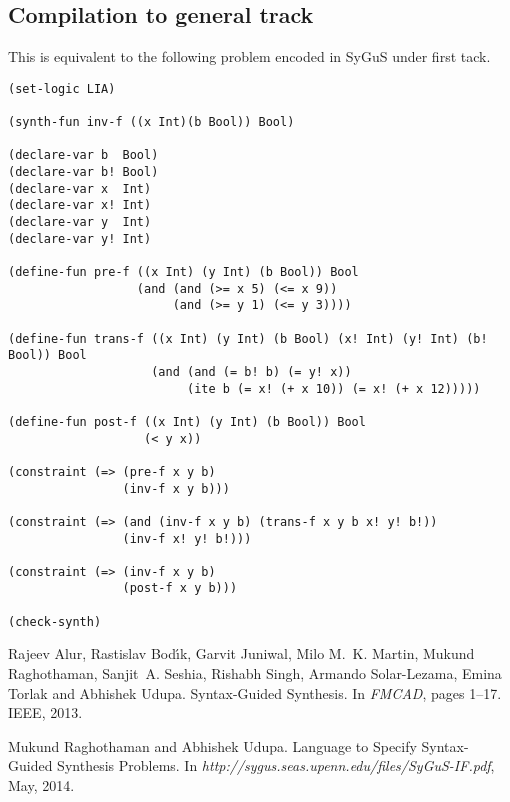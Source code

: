 \documentclass{llncs}
\begin{document}
\subsection*{Compilation to general track}
This is equivalent to the following problem encoded in SyGuS under first tack.

\begin{verbatim}
(set-logic LIA)

(synth-fun inv-f ((x Int)(b Bool)) Bool)

(declare-var b  Bool)
(declare-var b! Bool)
(declare-var x  Int)
(declare-var x! Int)
(declare-var y  Int)
(declare-var y! Int)

(define-fun pre-f ((x Int) (y Int) (b Bool)) Bool
                  (and (and (>= x 5) (<= x 9))
                       (and (>= y 1) (<= y 3))))
                       
(define-fun trans-f ((x Int) (y Int) (b Bool) (x! Int) (y! Int) (b! Bool)) Bool
                    (and (and (= b! b) (= y! x)) 
                         (ite b (= x! (+ x 10)) (= x! (+ x 12)))))
                         
(define-fun post-f ((x Int) (y Int) (b Bool)) Bool
                   (< y x))

(constraint (=> (pre-f x y b) 
                (inv-f x y b)))

(constraint (=> (and (inv-f x y b) (trans-f x y b x! y! b!)) 
                (inv-f x! y! b!)))

(constraint (=> (inv-f x y b) 
                (post-f x y b)))

(check-synth)
\end{verbatim}


\begin{thebibliography}{1}

Rajeev Alur, Rastislav Bod\'{\i}k, Garvit Juniwal, Milo M.~K. Martin, Mukund
  Raghothaman, Sanjit~A. Seshia, Rishabh Singh, Armando Solar-Lezama, Emina
  Torlak and Abhishek Udupa.
\newblock Syntax-Guided Synthesis.
\newblock In {\em FMCAD}, pages 1--17. IEEE, 2013.

Mukund Raghothaman and Abhishek Udupa.
\newblock Language to Specify Syntax-Guided Synthesis Problems.
\newblock In {\em http://sygus.seas.upenn.edu/files/SyGuS-IF.pdf}, May, 2014.

\end{thebibliography}
\end{document}
